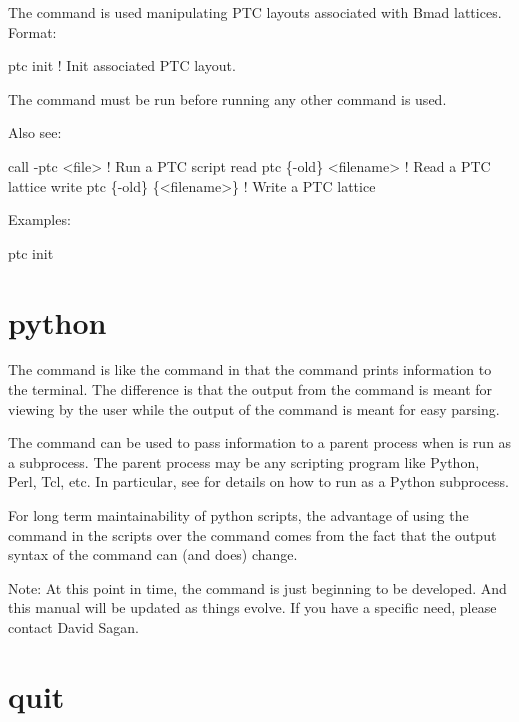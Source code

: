 The  command is used manipulating PTC layouts associated with 
Bmad lattices. Format:
\begin{example}
  ptc init            ! Init associated PTC layout.
\end{example}

\vskip 0.2in 

The  command must be run before running any other  command is used.

Also see:
\begin{example}
  call -ptc <file>                    ! Run a PTC script
  read ptc \{-old\} <filename>          ! Read a PTC lattice
  write ptc \{-old\} \{<filename>\}       ! Write a PTC lattice
\end{example}

Examples:
\begin{example}
  ptc init
\end{example}

\section{python}
\label{s:python}

The  command is like the  command in that the
 command prints information to the terminal.  The
difference is that the output from the  command is meant for
viewing by the user while the output of the  command is
meant for easy parsing.

The  command can be used to pass information to a parent
process when \tao is run as a subprocess.
The parent process may be any scripting program like Python, Perl,
Tcl, etc.  In particular, see  for details on how to
run \tao as a Python subprocess.

For long term maintainability of python scripts, the advantage of
using the  command in the scripts over the 
command comes from the fact that the output syntax of the 
 command can (and does) change. 

Note: At this point in time, the  command is just beginning
to be developed. And this manual will be updated as things evolve. If
you have a specific need, please contact David Sagan.

\section{quit}
\label{s:quit}

